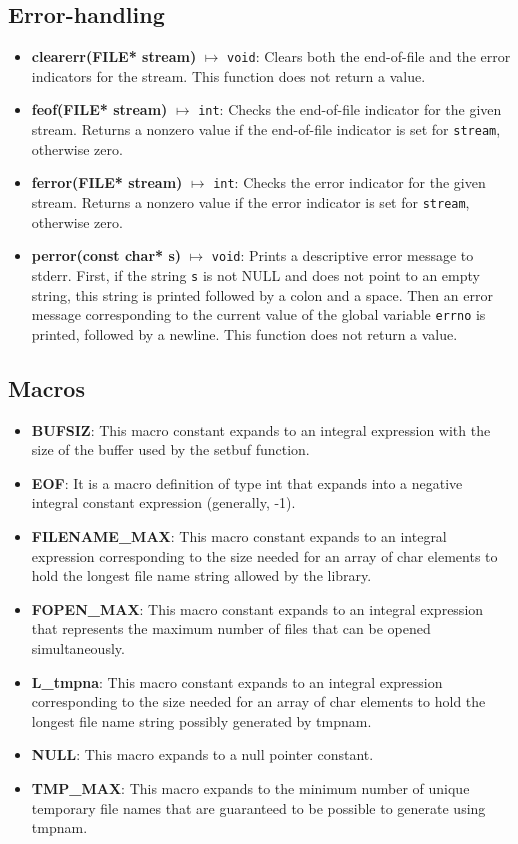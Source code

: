 \documentclass{report}
\begin{document}
    \subsection{Error-handling}
    \begin{itemize}
        \item \textbf{clearerr(FILE* stream)} $\mapsto$ \texttt{void}: Clears both the end-of-file and the error indicators for the stream. This function does not return a value.
        \item \textbf{feof(FILE* stream)} $\mapsto$ \texttt{int}: Checks the end-of-file indicator for the given stream. Returns a nonzero value if the end-of-file indicator is set for \texttt{stream}, otherwise zero.
        \item \textbf{ferror(FILE* stream)} $\mapsto$ \texttt{int}: Checks the error indicator for the given stream. Returns a nonzero value if the error indicator is set for \texttt{stream}, otherwise zero.
        \item \textbf{perror(const char* s)} $\mapsto$ \texttt{void}: Prints a descriptive error message to stderr. First, if the string \texttt{s} is not NULL and does not point to an empty string, this string is printed followed by a colon and a space. Then an error message corresponding to the current value of the global variable \texttt{errno} is printed, followed by a newline. This function does not return a value.
    \end{itemize}

    \bigbreak \noindent 
    \subsection{Macros}
    \begin{itemize}
        \item \textbf{BUFSIZ}: This macro constant expands to an integral expression with the size of the buffer used by the setbuf function.
        \item \textbf{EOF}: It is a macro definition of type int that expands into a negative integral constant expression (generally, -1).
        \item \textbf{FILENAME\_MAX}: This macro constant expands to an integral expression corresponding to the size needed for an array of char elements to hold the longest file name string allowed by the library.
        \item \textbf{FOPEN\_MAX}: This macro constant expands to an integral expression that represents the maximum number of files that can be opened simultaneously.
        \item \textbf{L\_tmpna}: This macro constant expands to an integral expression corresponding to the size needed for an array of char elements to hold the longest file name string possibly generated by tmpnam.
        \item \textbf{NULL}: This macro expands to a null pointer constant.
        \item \textbf{TMP\_MAX}: This macro expands to the minimum number of unique temporary file names that are guaranteed to be possible to generate using tmpnam.
    \end{itemize}
\end{document}
